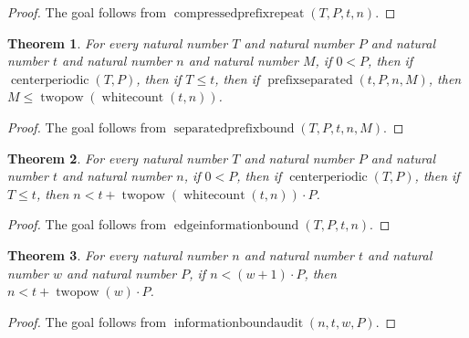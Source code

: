 \documentclass[11pt]{article}
\newtheorem{theorem}{Theorem}[section]
\theoremstyle{definition}
\begin{document}
\begin{proof}
The goal follows from \(\operatorname{compressedprefixrepeat}(T, P, t, n)\).
\end{proof}
\begin{theorem}
\label{ll:observations:separated-prefix-bound}
For every natural number \(T\) and natural number \(P\) and natural number \(t\) and natural number \(n\) and natural number \(M\), if \(0 < P\), then if \(\operatorname{centerperiodic}(T, P)\), then if \(T \le t\), then if \(\operatorname{prefixseparated}(t, P, n, M)\), then \(M \le \operatorname{twopow}(\operatorname{whitecount}(t, n))\).
\end{theorem}
\begin{proof}
The goal follows from \(\operatorname{separatedprefixbound}(T, P, t, n, M)\).
\end{proof}
\begin{theorem}
\label{ll:observations:edge-information-bound}
For every natural number \(T\) and natural number \(P\) and natural number \(t\) and natural number \(n\), if \(0 < P\), then if \(\operatorname{centerperiodic}(T, P)\), then if \(T \le t\), then \(n < t + \operatorname{twopow}(\operatorname{whitecount}(t, n)) \cdot P\).
\end{theorem}
\begin{proof}
The goal follows from \(\operatorname{edgeinformationbound}(T, P, t, n)\).
\end{proof}
\begin{theorem}
\label{ll:observations:information-bound-audit}
For every natural number \(n\) and natural number \(t\) and natural number \(w\) and natural number \(P\), if \(n < (w + 1) \cdot P\), then \(n < t + \operatorname{twopow}(w) \cdot P\).
\end{theorem}
\begin{proof}
The goal follows from \(\operatorname{informationboundaudit}(n, t, w, P)\).
\end{proof}
\end{document}
